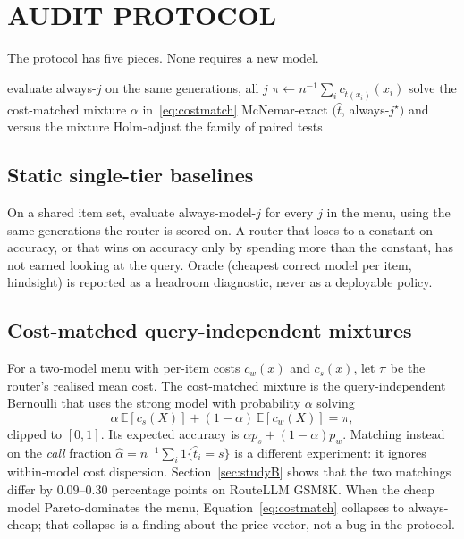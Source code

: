 \documentclass[a4paper,twoside]{article}
\begin{document}
\section{\uppercase{Audit Protocol}}
\label{sec:protocol}

The protocol has five pieces. None requires a new model.

\begin{algorithm}[t]
\DontPrintSemicolon
\caption{Audit a $k$-model cross-API router on a frozen panel.}
\label{alg:audit}
evaluate always-$j$ on the same generations, all $j$\;
$\pi \leftarrow n^{-1}\sum_i c_{\hat t(x_i)}(x_i)$ 
solve the cost-matched mixture $\alpha$ in~\eqref{eq:costmatch}\;
McNemar-exact $(\hat t$, always-$j^\star)$ and versus the mixture\;
Holm-adjust the family of paired tests\;
\end{algorithm}

\subsection{Static single-tier baselines}

On a shared item set, evaluate always-model-$j$ for every $j$ in the menu, using the same generations the router is scored on. A router that loses to a constant on accuracy, or that wins on accuracy only by spending more than the constant, has not earned looking at the query. Oracle (cheapest correct model per item, hindsight) is reported as a headroom diagnostic, never as a deployable policy.

\subsection{Cost-matched query-independent mixtures}

For a two-model menu with per-item costs $c_w(x)$ and $c_s(x)$, let $\pi$ be the router's realised mean cost. The cost-matched mixture is the query-independent Bernoulli that uses the strong model with probability $\alpha$ solving
\begin{equation}
\alpha\,\mathbb{E}[c_s(X)] + (1-\alpha)\,\mathbb{E}[c_w(X)] = \pi,
\label{eq:costmatch}
\end{equation}
clipped to $[0,1]$. Its expected accuracy is $\alpha p_s + (1-\alpha)p_w$. Matching instead on the \emph{call} fraction $\hat\alpha = n^{-1}\sum_i 1\{\hat t_i = s\}$ is a different experiment: it ignores within-model cost dispersion. Section~\ref{sec:studyB} shows that the two matchings differ by $0.09$--$0.30$ percentage points on RouteLLM GSM8K. When the cheap model Pareto-dominates the menu, Equation~\eqref{eq:costmatch} collapses to always-cheap; that collapse is a finding about the price vector, not a bug in the protocol.
\end{document}
